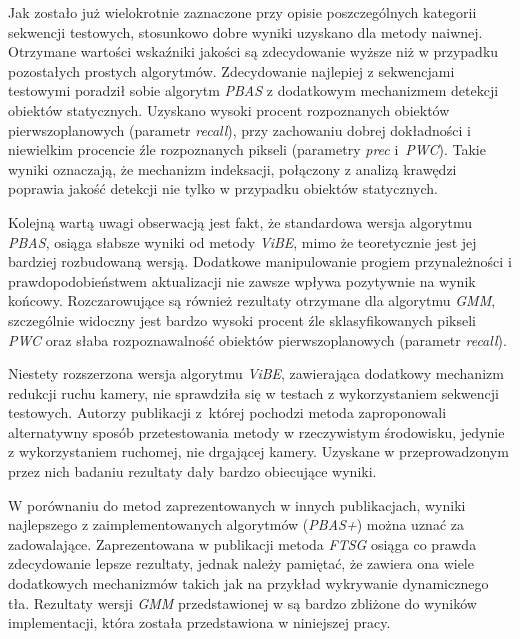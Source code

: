 Jak zostało już wielokrotnie zaznaczone przy opisie poszczególnych kategorii sekwencji testowych, stosunkowo dobre wyniki uzyskano dla metody naiwnej. 
Otrzymane wartości wskaźniki jakości są zdecydowanie wyższe niż w przypadku pozostałych prostych algorytmów. 
Zdecydowanie najlepiej z sekwencjami testowymi poradził sobie algorytm \textit{PBAS} z dodatkowym mechanizmem detekcji obiektów statycznych.
Uzyskano wysoki procent rozpoznanych obiektów pierwszoplanowych (parametr \textit{recall}), przy zachowaniu dobrej dokładności i niewielkim procencie źle rozpoznanych pikseli (parametry \textit{prec} i~\textit{PWC}). 
Takie wyniki oznaczają, że mechanizm indeksacji, połączony z analizą krawędzi poprawia jakość detekcji nie tylko w przypadku obiektów statycznych. 

Kolejną wartą uwagi obserwacją jest fakt, że standardowa wersja algorytmu \textit{PBAS}, osiąga słabsze wyniki od metody \textit{ViBE}, mimo że teoretycznie jest jej bardziej rozbudowaną wersją. %
Dodatkowe manipulowanie progiem przynależności i prawdopodobieństwem aktualizacji nie zawsze wpływa pozytywnie na wynik końcowy. 
Rozczarowujące są również rezultaty otrzymane dla algorytmu \textit{GMM}, szczególnie widoczny jest bardzo wysoki procent źle sklasyfikowanych pikseli \textit{PWC} oraz słaba rozpoznawalność obiektów pierwszoplanowych (parametr \textit{recall}).

Niestety rozszerzona wersja algorytmu \textit{ViBE}, zawierająca dodatkowy mechanizm redukcji ruchu kamery, nie sprawdziła się w testach z wykorzystaniem sekwencji testowych. 
Autorzy publikacji \cite{kryjak_14_vibe} z~której pochodzi metoda zaproponowali alternatywny sposób przetestowania metody w rzeczywistym środowisku, jedynie z wykorzystaniem ruchomej, nie drgającej kamery. 
Uzyskane w przeprowadzonym przez nich badaniu rezultaty dały bardzo obiecujące wyniki.


W porównaniu do metod zaprezentowanych w innych publikacjach, wyniki najlepszego z zaimplementowanych algorytmów (\textit{PBAS+}) można uznać za zadowalające. 
Zaprezentowana w publikacji \cite{wang_14} metoda \textit{FTSG} osiąga co prawda zdecydowanie lepsze rezultaty, jednak należy pamiętać, że zawiera ona wiele dodatkowych mechanizmów takich jak na przykład wykrywanie dynamicznego tła. 
Rezultaty wersji \textit{GMM} przedstawionej w \cite{KaewTraKulPong_01} są bardzo zbliżone do wyników implementacji, która została przedstawiona w niniejszej pracy.
